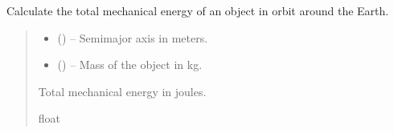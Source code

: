 \documentclass[letterpaper,10pt,english]{sphinxmanual}
\begin{document}

\begin{fulllineitems}
\label{\detokenize{fspsim.utils:fspsim.utils.Conversions.calculate_energy_from_semi_major_axis}}
\pysigstartsignatures
{}
\pysigstopsignatures
\sphinxAtStartPar
Calculate the total mechanical energy of an object in orbit around the Earth.
\begin{quote}\begin{description}
\begin{itemize}
\item {} 
\sphinxAtStartPar
{} () – Semi\sphinxhyphen{}major axis in meters.

\item {} 
\sphinxAtStartPar
{} () – Mass of the object in kg.

\end{itemize}

\sphinxAtStartPar
Total mechanical energy in joules.

\sphinxAtStartPar
float

\end{description}\end{quote}

\end{fulllineitems}

\end{document}
